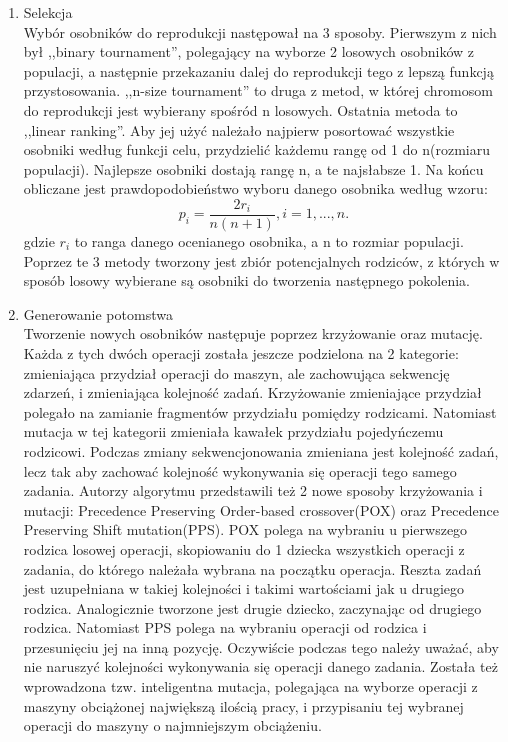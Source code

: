 \documentclass{article}
\begin{document}
\begin{enumerate}
 \item Selekcja\\
 Wybór osobników do reprodukcji następował na 3 sposoby. Pierwszym z nich był ,,binary tournament'', polegający na wyborze 2 losowych osobników z populacji, a następnie przekazaniu dalej do reprodukcji tego z lepszą funkcją przystosowania. ,,n-size tournament'' to druga z metod, w której chromosom do reprodukcji jest wybierany spośród n losowych. Ostatnia metoda to ,,linear ranking''. Aby jej użyć należało najpierw posortować wszystkie osobniki według funkcji celu, przydzielić każdemu rangę od 1 do n(rozmiaru populacji). Najlepsze osobniki dostają rangę n, a te najsłabsze 1. Na końcu obliczane jest prawdopodobieństwo wyboru danego osobnika według wzoru:
 \begin{equation}
 p_{i} = \frac{2r_{i}}{n(n+1)}, i=1, ..., n.
 \end{equation}
 gdzie $r_{i}$ to ranga danego ocenianego osobnika, a n to rozmiar populacji.
 Poprzez te 3 metody tworzony jest zbiór potencjalnych rodziców, z których w sposób losowy wybierane są osobniki do tworzenia następnego pokolenia.

 \item Generowanie potomstwa\\
 Tworzenie nowych osobników następuje poprzez krzyżowanie oraz mutację. Każda z tych dwóch operacji została jeszcze podzielona na 2 kategorie: zmieniająca przydział operacji do maszyn, ale zachowująca sekwencję zdarzeń, i zmieniająca kolejność zadań. Krzyżowanie zmieniające przydział polegało na zamianie fragmentów przydziału pomiędzy rodzicami. Natomiast mutacja w tej kategorii zmieniała kawałek przydziału pojedyńczemu rodzicowi. Podczas zmiany sekwencjonowania zmieniana jest kolejność zadań, lecz tak aby zachować kolejność wykonywania się operacji tego samego zadania. Autorzy algorytmu przedstawili też 2 nowe sposoby krzyżowania i mutacji: Precedence Preserving Order-based crossover(POX) oraz Precedence Preserving Shift mutation(PPS). POX polega na wybraniu u pierwszego rodzica losowej operacji, skopiowaniu do 1 dziecka wszystkich operacji z zadania, do którego należała wybrana na początku operacja. Reszta zadań jest uzupełniana w takiej kolejności i takimi wartościami jak u drugiego rodzica. Analogicznie tworzone jest drugie dziecko, zaczynając od drugiego rodzica. Natomiast PPS polega na wybraniu operacji od rodzica i przesunięciu jej na inną pozycję. Oczywiście podczas tego należy uważać, aby nie naruszyć kolejności wykonywania się operacji danego zadania. Została też wprowadzona tzw. inteligentna mutacja, polegająca na wyborze operacji z maszyny obciążonej największą ilością pracy, i przypisaniu tej wybranej operacji do maszyny o najmniejszym obciążeniu.
 \end{enumerate}
\end{document}
